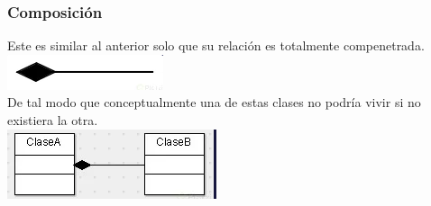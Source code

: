 \documentclass[executivepaper]{article}
\begin{document}
\subsubsection*{Composición}
Este es similar al anterior solo que su relación es totalmente compenetrada.\\
\includegraphics[scale=0.5]{2.8.png}\\
De tal modo que conceptualmente una de estas clases no podría vivir si no existiera la otra.\\
\includegraphics[scale=0.5]{2.9.png}\\
\end{document}
